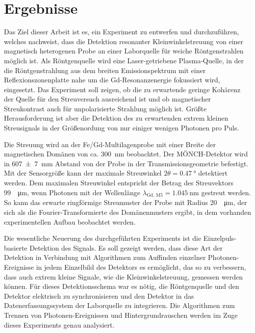 \chapter{Ergebnisse}
\label{text:auswertung}
Das Ziel dieser Arbeit ist es, ein Experiment zu entwerfen und durchzuführen, welches nachweist, dass die Detektion resonanter Kleinwinkelstreuung von einer magnetisch heterogenen Probe an einer Laborquelle für weiche Röntgenstrahlen möglich ist. Als Röntgenquelle wird eine Laser-getriebene Plasma-Quelle, in der die Röntgenstrahlung aus dem breiten Emissionspektrum mit einer Reflexionszonenplatte nahe um die Gd-Resonanzenergie fokussiert wird, eingesetzt. Das Experiment soll zeigen, ob die zu erwartende geringe Kohärenz der Quelle für den Streuversuch ausreichend ist und ob magnetischer Streukontrast auch für unpolarisierte Strahlung möglich ist. Größte Herausforderung ist aber die Detektion des zu erwartenden extrem kleinen Streusignals in der Größenordung von nur einiger wenigen Photonen pro Puls.

\noindent
Die Streuung wird an der Fe/Gd-Multilagenprobe mit einer Breite der magnetischen Domänen von ca. \SI{300}{\nano\meter} beobachtet. Der MÖNCH-Detektor wird in \SI{607(7)}{\milli\meter} Abstand von der Probe in der Transmissionsgeometrie befestigt. Mit der  Sensorgröße kann der maximale Streuwinkel $2\theta = \SI{0.47}{\degree}$ detektiert werden. Dem maximalen Streuwinkel entspricht der Betrag des Streuvektors \SI{99}{\per\micro\meter}, wenn Photonen mit der Wellenlänge $\lambda_\text{Gd, M5} = \SI{1.045}{\nano\meter}$ gestreut werden. So kann das erwarte ringförmige Streumuster der Probe mit Radius \SI{20}{\per\micro\meter}, der sich als die Fourier-Transformierte des Domänenmusters ergibt, in dem vorhanden experimentellen Aufbau beobachtet werden.

\noindent
Die wesentliche Neuerung des durchgeführten Experiments ist die Einzelpuls-basierte Detektion des Signals. Es soll gezeigt werden, dass diese Art der Detektion in Verbindung mit Algorithmen zum Auffinden einzelner Photonen-Ereignisse in jedem Einzelbild des Detektors es ermöglicht, das  so zu verbessern, dass auch extrem kleine Signale, wie die Kleinwinkelstreuung, gemessen werden können. Für dieses Detektionsschema war es nötig, die Röntgenquelle und den Detektor elektrisch zu synchronisieren und den Detektor in das Datenerfassungssystem der Laborquelle zu integrieren. Die Algorithmen zum Trennen von Photonen-Ereignissen und Hintergrundrauschen werden im Zuge dieses Experiments genau analysiert.

